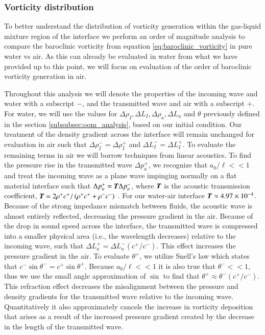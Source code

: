 \subsubsection{Vorticity distribution}
To better understand the distribution of vorticity generation within
the gas-liquid mixture region of the interface we perform an order of
magnitude analysis to compare the baroclinic vorticity from equation
\eqref{eq:baroclinic_vorticity} in pure water vs air. As this can
already be evaluated in water from what we have provided up to this
point, we will focus on evaluation of the order of baroclinic
vorticity generation in air.

Throughout this analysis we will denote the properties of the incoming
wave and water with a subscript $-$, and the transmitted wave and air
with a subscript $+$. For water, we will use the values for
$\Delta \rho_I, \Delta L_I, \Delta \rho_a, \Delta L_a$ and $\theta$
previously defined in the section \ref{subsubsec:oom_analysis}, based
on our initial condition. Our treatment of the density gradient across
the interface will remain unchanged for evaluation in air such that
$\Delta \rho_I^-=\Delta \rho_I^+$ and $\Delta L_I^-=\Delta L_I^+$. To
evaluate the remaining terms in air we will borrow techniques from
linear acoustics. To find the pressure rise in the transmitted wave
$\Delta p_a^+$, we recognize that $a_0/\ell<<1$ and treat the
incoming wave as a plane wave impinging normally on a flat material
interface such that $\Delta p_a^+=\boldsymbol{T} \Delta p_a^-$, where $\boldsymbol{T}$
is the acoustic transmission coefficient,
$\boldsymbol{T}=2\rho^+ c^+/\left(\rho^+ c^+ + \rho^- c^- \right)$
\citep{Kinsler1982}. For our water-air interface
$\boldsymbol{T}\approx4.97\times10^{-4}$. Because of the strong impedance
mismatch between fluids, the acoustic wave is almost entirely
reflected, decreasing the pressure gradient in the air. Because of the
drop in sound speed across the interface, the transmitted wave is
compressed into a smaller physical area (i.e., the wavelength
decreases) relative to the incoming wave, such that
$\Delta L_a^+=\Delta L_a^- (c^+/c^-)$. This effect increases the
pressure gradient in the air. To evaluate $\theta^+$, we utilize
Snell's law which states that
$c^-\sin{\theta^-}=c^+\sin{\theta^+}$. Because $a_0/\ell<<1$ it is
also true that $\theta^-<<1$, thus we use the small angle
approximation of $\sin$ to find that
$\theta^+\approx\theta^-(c^+/c^-)$. This refraction effect decreases
the misalignment between the pressure and density gradients for the
transmitted wave relative to the incoming wave. Quantitatively it also
approximately cancels the increase in vorticity deposition that arises
as a result of the increased pressure gradient created by the decrease
in the length of the transmitted wave.

